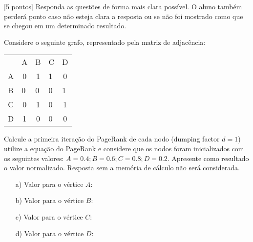 \documentclass[16pt]{examdesign}
\begin{document}
\begin{fillin}[title={},
                    rearrange=no,resetcounter=no,suppressprefix]

[5 pontos] 
          Responda as questões de forma mais clara possível.
          O aluno também perderá ponto caso não esteja clara a resposta ou se não foi mostrado como que se chegou em um determinado resultado.
  \begin{question}
	  Considere o seguinte grafo, representado pela matriz de adjacência:
	  
	  \begin{tabular}{ccclc}
                       & A                      & B                      & C                      & D                      \\ \cline{2-5} 
\multicolumn{1}{c|}{A} & \multicolumn{1}{c|}{0} & \multicolumn{1}{c|}{1} & \multicolumn{1}{l|}{1} & \multicolumn{1}{c|}{0} \\ \cline{2-5} 
\multicolumn{1}{l|}{B} & \multicolumn{1}{l|}{0} & \multicolumn{1}{l|}{0} & \multicolumn{1}{l|}{0} & \multicolumn{1}{l|}{1} \\ \cline{2-5} 
\multicolumn{1}{c|}{C} & \multicolumn{1}{c|}{0} & \multicolumn{1}{c|}{1} & \multicolumn{1}{l|}{0} & \multicolumn{1}{c|}{1} \\ \cline{2-5} 
\multicolumn{1}{c|}{D} & \multicolumn{1}{c|}{1} & \multicolumn{1}{c|}{0} & \multicolumn{1}{l|}{0} & \multicolumn{1}{c|}{0} \\ \cline{2-5} 
\end{tabular}
	  
	  Calcule a primeira iteração do PageRank de cada nodo (dumping factor $d = 1$) utilize a equação do PageRank e considere que os nodos 
	  foram inicializados com os seguintes valores: $A=0.4; B=0.6; C=0.8; D=0.2$. Apresente como resultado o valor normalizado. 
	  Resposta sem a memória de cálculo não será considerada.\\
	  
      \begin{multicols}{2}[]
	    \begin{enumerate}
	    \item[a)] Valor para o vértice $A$:  
	    \item[b)] Valor para o vértice $B$:  
	    \item[c)] Valor para o vértice $C$:  
	    \item[d)] Valor para o vértice $D$:  
	    \end{enumerate}
      \end{multicols}


\end{question}
\end{fillin}
\end{document}
